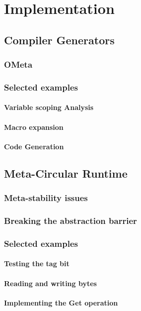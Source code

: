 \chapter{Implementation}

\section{Compiler Generators}

\subsection{OMeta}

\subsection{Selected examples}

\subsubsection{Variable scoping Analysis}

\subsubsection{Macro expansion}

\subsubsection{Code Generation}

\section{Meta-Circular Runtime}

\subsection{Meta-stability issues}

\subsection{Breaking the abstraction barrier}

\subsection{Selected examples}

\subsubsection{Testing the tag bit}

\subsubsection{Reading and writing bytes}

\subsubsection{Implementing the Get operation}
